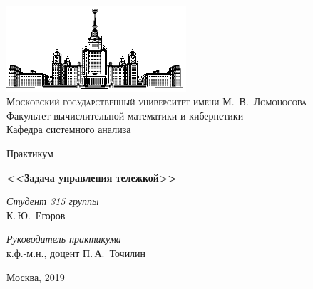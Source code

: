 \thispagestyle{empty}
\begin{center}
    \ \vspace{-3cm}

    \includegraphics[width=0.5\textwidth]{title_page/msu.eps}\\

    {\scshape Московский государственный университет имени М.~В.~Ломоносова}\\
    Факультет вычислительной математики и кибернетики\\
    Кафедра системного анализа

    \vfill

    {\LARGE Практикум}

    \vspace{1cm}

    {\Huge\bfseries <<Задача управления тележкой>>}
\end{center}

\vspace{3cm}

\begin{flushright}
    \large
    \textit{Студент 315 группы}\\
    К.\,Ю.~Егоров

    \vspace{5mm}

    \textit{Руководитель практикума}\\
    к.ф.-м.н., доцент П.\,А.~Точилин
\end{flushright}

\vfill

\begin{center}
    Москва, 2019
\end{center}

\clearpage